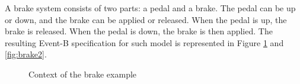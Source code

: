 \begin{example}
\normalfont
A brake system consists of two parts: a pedal and a brake. The pedal can be up or down, and the brake can be applied or released. When the pedal is up, the brake is released. When the pedal is down, the brake is then applied. The resulting Event-B specification for such model is represented in Figure \ref{fig:brake1} and \ref{fig:brake2}.
\begin{figure}[H]
    \centering
    \caption{Context of the brake example}
    \label{fig:brake1}
\end{figure}
\begin{figure}[H]
    \centering
    \quad

\end{figure}
\end{example}
